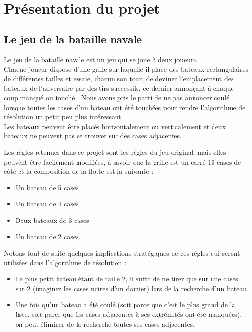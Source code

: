 \chapter{Présentation du projet}

\section{Le jeu de la bataille navale}
Le jeu de la bataille navale est un jeu qui se joue à deux joueurs.\\
Chaque joueur dispose d'une grille sur laquelle il place des bateaux rectangulaires de différentes tailles et essaie, chacun son tour, de deviner l'emplacement des bateaux de l'adversaire par des tirs successifs, ce dernier annonçant à chaque coup \og manqué \fg{} ou \og touché \fg{}. Nous avons pris le parti de ne pas annoncer \og coulé \fg{} lorsque toutes les cases d'un bateau ont été touchées pour rendre l'algorithme de résolution un petit peu plus intéressant.\\
Les bateaux peuvent être placés horizontalement ou verticalement et deux bateaux ne peuvent pas se trouver sur des cases adjacentes.

Les règles retenues dans ce projet sont les règles du jeu original, mais elles peuvent être facilement modifiées, à savoir que la grille est un carré 10 cases de côté et la composition de la flotte est la suivante :
\begin{itemize}
\item Un bateau de 5 cases
\item Un bateau de 4 cases
\item Deux bateaux de 3 cases
\item Un bateau de 2 cases
\end{itemize}



Notons tout de suite quelques implications stratégiques de ces règles qui seront utilisées dans l'algorithme de résolution :
\begin{itemize}
\item Le plus petit bateau étant de taille 2, il suffit de ne tirer que sur une cases sur 2 (imaginez les cases noires d'un damier) lors de la recherche d'un bateau.
\item Une fois qu'un bateau a été coulé (soit parce que c'est le plus grand de la liste, soit parce que les cases adjacentes à ses extrémités ont été manquées), on peut éliminer de la recherche toutes ses cases adjacentes.
\end{itemize}

